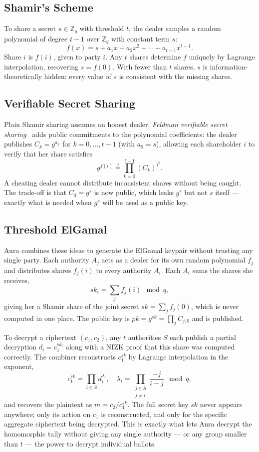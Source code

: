 \documentclass[12pt,a4paper,oneside]{report}
\begin{document}
\subsection*{Shamir's Scheme}
To share a secret $s \in \mathbb{Z}_q$ with threshold $t$, the dealer 
samples a random polynomial of degree $t - 1$ over $\mathbb{Z}_q$ with 
constant term $s$:
\[
    f(x) = s + a_1 x + a_2 x^2 + \cdots + a_{t-1} x^{t-1}.
\]
Share $i$ is $f(i)$, given to party $i$. Any $t$ shares determine $f$ 
uniquely by Lagrange interpolation, recovering $s = f(0)$. With fewer 
than $t$ shares, $s$ is information-theoretically hidden: every value 
of $s$ is consistent with the missing shares.

\subsection*{Verifiable Secret Sharing}
Plain Shamir sharing assumes an honest dealer. \textit{Feldman verifiable 
secret sharing}~\cite{feldman} adds public commitments to the polynomial 
coefficients: the dealer publishes $C_k = g^{a_k}$ for $k = 0, \ldots, t - 1$ 
(with $a_0 = s$), allowing each shareholder $i$ to verify that her share 
satisfies
\[
    g^{f(i)} \stackrel{?}{=} \prod_{k = 0}^{t-1} (C_k)^{i^k}.
\]
A cheating dealer cannot distribute inconsistent shares without being 
caught. The trade-off is that $C_0 = g^s$ is now public, which leaks 
$g^s$ but not $s$ itself --- exactly what is needed when $g^s$ will be 
used as a public key.

\subsection*{Threshold ElGamal}
Aura combines these ideas to generate the ElGamal keypair without trusting 
any single party. Each authority $A_j$ acts as a dealer for its own random 
polynomial $f_j$ and distributes shares $f_j(i)$ to every authority 
$A_i$. Each $A_i$ sums the shares she receives,
\[
    sk_i = \sum_{j} f_j(i) \mod q,
\]
giving her a Shamir share of the joint secret $sk = \sum_j f_j(0)$, which 
is never computed in one place. The public key is $pk = g^{sk} = \prod_j C_{j,0}$ 
and is published.

To decrypt a ciphertext $(c_1, c_2)$, any $t$ authorities $S$ each publish 
a partial decryption $d_i = c_1^{sk_i}$ along with a NIZK proof that this 
share was computed correctly. The combiner reconstructs $c_1^{sk}$ by 
Lagrange interpolation in the exponent,
\[
    c_1^{sk} = \prod_{i \in S} d_i^{\lambda_i}, \quad
    \lambda_i = \prod_{\substack{j \in S \\ j \ne i}} \frac{-j}{i - j} \mod q,
\]
and recovers the plaintext as $m = c_2 / c_1^{sk}$. The full secret key 
$sk$ never appears anywhere; only its action on $c_1$ is reconstructed, 
and only for the specific aggregate ciphertext being decrypted. This is 
exactly what lets Aura decrypt the homomorphic tally without giving any 
single authority --- or any group smaller than $t$ --- the power to 
decrypt individual ballots.
\end{document}
